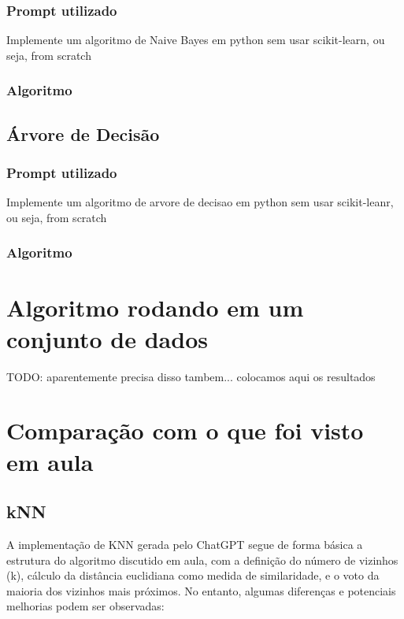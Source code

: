 \documentclass[12pt]{article}
\begin{document}
\subsubsection{Prompt utilizado}
Implemente um algoritmo de Naive Bayes em python sem usar scikit-learn, ou seja, from scratch
\subsubsection{Algoritmo}


\subsection{Árvore de Decisão}
\subsubsection{Prompt utilizado}
Implemente um algoritmo de arvore de decisao em python sem usar scikit-leanr, ou seja, from scratch
\subsubsection{Algoritmo}







\section{Algoritmo rodando em um conjunto de dados}

TODO: aparentemente precisa disso tambem...
colocamos aqui os resultados




\section{Comparação com o que foi visto em aula}
\label{sec:comparacao}

\subsection{kNN}

A implementação de KNN gerada pelo ChatGPT segue de forma básica a estrutura do algoritmo discutido em aula, com a definição do número de vizinhos (k), cálculo da distância euclidiana como medida de similaridade, e o voto da maioria dos vizinhos mais próximos. No entanto, algumas diferenças e potenciais melhorias podem ser observadas:
\end{document}
